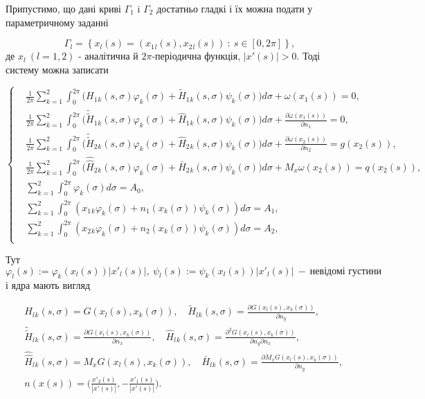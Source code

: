 \documentclass[12pt]{report}
\begin{document}
Припустимо, що дані криві $\Gamma_1$ i $\Gamma_2$ достатньо гладкі і їх можна подати у параметричному заданні 
 
 \begin{equation}
 	\Gamma_l=\left\{x_l(s)=(x_1{_l}(s),x_2{_l}(s)) \ : \ s\in [0,2\pi]\right\},
  \end{equation}
 де $x_l \ (l=1,2)$ - аналітична й $2\pi$-періодична функція, $|x'(s)|>0.$
 Тоді систему можна записати 
 
 \begin{equation}
 		\left\{
	 	\begin{split}
		\label{paramSystem}
	 		&\frac{1}{2\pi}\sum_{k=1}^{2}\int_{0}^{2\pi}\bigg(H_1{_k}(s, \sigma)\varphi_k(\sigma)+\tilde{H}_1{_k}(s, \sigma)\psi_k(\sigma)\bigg)d\sigma+\omega(x_1(s))=0,\\
			&\frac{1}{2\pi}\sum_{k=1}^{2}\int_{0}^{2\pi}\bigg(\tilde{\tilde{H}}_1{_k}(s, \sigma)\varphi_k(\sigma)+\hat{H}_1{_k}(s, \sigma)\psi_k(\sigma)\bigg)d\sigma+\frac{\partial\omega(x_1(s))}{\partial n_1}=0, \\
			&\frac{1}{2\pi}\sum_{k=1}^{2}\int_{0}^{2\pi}\bigg(\tilde{\tilde{H}}_2{_k}(s, \sigma)\varphi_k(\sigma)+\hat{H}_2{_k}(s, \sigma)\psi_k(\sigma)\bigg)d\sigma+\frac{\partial\omega(x_2(s))}{\partial n_2}=g(x_2(s)), \\
			&\frac{1}{2\pi}\sum_{k=1}^{2}\int_{0}^{2\pi}\bigg(\hat{\hat{H}}_2{_k}(s, \sigma)\varphi_k(\sigma)+\bar{H}_2{_k}(s, \sigma)\psi_k(\sigma)\bigg)d\sigma+M_x\omega(x_2(s))=q(x_2(s)),\\
			&\sum_{k=1}^{2}\int_{0}^{2\pi}\varphi_k(\sigma)d\sigma=A_0, \\
			&\sum_{k=1}^{2}\int_{0}^{2\pi}(x_1{_k}\varphi_k(\sigma)+n_1(x_k(\sigma))\psi_k(\sigma))d\sigma=A_1, \\
			&\sum_{k=1}^{2}\int_{0}^{2\pi}(x_2{_k}\varphi_k(\sigma)+n_2(x_k(\sigma))\psi_k(\sigma))d\sigma=A_2, \\
		\end{split}
		\right.
\end{equation}

Тут $ \label{kernels} \varphi_l(s) :=\varphi_k(x_l(s))|x'_l(s)|, \ \psi_l(s) :=\psi_k(x_l(s))|x'_l(s)| \ - \ \textrm{невідомі густини} $ і ядра мають вигляд
 
 \begin{equation}
 \begin{split}
	&H_l{_k}(s, \sigma) = G(x_l(s),x_k(\sigma)), \quad \tilde{H}_l{_k}(s, \sigma)=\frac{\partial G(x_l(s),x_k(\sigma))}{\partial n_y}, \\
	&\tilde{\tilde{H}}_l{_k}(s, \sigma)=\frac{\partial G(x_l(s),x_k(\sigma))}{\partial n_x}, \quad \hat{H}_l{_k}(s, \sigma)=\frac{\partial^2 G(x_l(s),x_k(\sigma))}{\partial n_y\partial n_x}, \\
	&\hat{\hat{H}}_l{_k}(s, \sigma) = M_xG(x_l(s),x_k(\sigma)), \quad \bar{H}_l{_k}(s, \sigma)=\frac{\partial M_xG(x_l(s),x_k(\sigma))}{\partial n_y}, \\
	&n(x(s))=\Big(\frac{x'_2(s)}{|x'(s)|},-\frac{x'_1(s)}{|x'(s)|}\Big) \nonumber. 
 \end{split}
 \end{equation}
 
\end{document}
